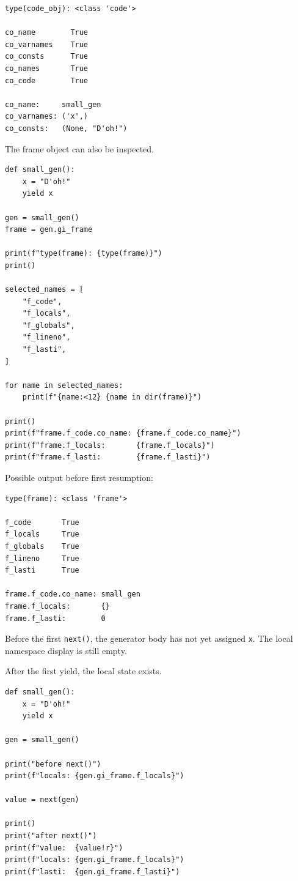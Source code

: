 \begin{verbatim}
type(code_obj): <class 'code'>

co_name        True
co_varnames    True
co_consts      True
co_names       True
co_code        True

co_name:     small_gen
co_varnames: ('x',)
co_consts:   (None, "D'oh!")
\end{verbatim}

The frame object can also be inspected.

\begin{verbatim}
def small_gen():
    x = "D'oh!"
    yield x

gen = small_gen()
frame = gen.gi_frame

print(f"type(frame): {type(frame)}")
print()

selected_names = [
    "f_code",
    "f_locals",
    "f_globals",
    "f_lineno",
    "f_lasti",
]

for name in selected_names:
    print(f"{name:<12} {name in dir(frame)}")

print()
print(f"frame.f_code.co_name: {frame.f_code.co_name}")
print(f"frame.f_locals:       {frame.f_locals}")
print(f"frame.f_lasti:        {frame.f_lasti}")
\end{verbatim}

Possible output before first resumption:

\begin{verbatim}
type(frame): <class 'frame'>

f_code       True
f_locals     True
f_globals    True
f_lineno     True
f_lasti      True

frame.f_code.co_name: small_gen
frame.f_locals:       {}
frame.f_lasti:        0
\end{verbatim}

Before the first \texttt{next()}, the generator body has not yet assigned \texttt{x}. The local namespace display is still empty.

After the first yield, the local state exists.

\begin{verbatim}
def small_gen():
    x = "D'oh!"
    yield x

gen = small_gen()

print("before next()")
print(f"locals: {gen.gi_frame.f_locals}")

value = next(gen)

print()
print("after next()")
print(f"value:  {value!r}")
print(f"locals: {gen.gi_frame.f_locals}")
print(f"lasti:  {gen.gi_frame.f_lasti}")
\end{verbatim}


